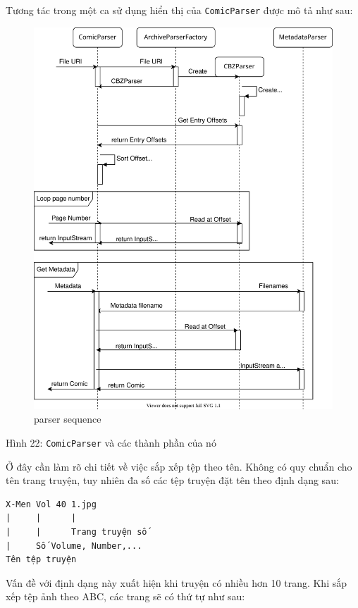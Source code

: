 \documentclass[
]{article}
\begin{document}
Tương tác trong một ca sử dụng hiển thị của \texttt{ComicParser} được mô
tả như sau:

\begin{figure}
\centering
\includegraphics{../images/parser_sequence.svg}
\caption{parser sequence}
\end{figure}

Hình 22: \texttt{ComicParser} và các thành phần của nó

Ở đây cần làm rõ chi tiết về việc sắp xếp tệp theo tên. Không có quy
chuẩn cho tên trang truyện, tuy nhiên đa số các tệp truyện đặt tên theo
định dạng sau:

\begin{verbatim}
X-Men Vol 40 1.jpg
|     |      |
|     |      Trang truyện số
|     Số Volume, Number,...
Tên tệp truyện
\end{verbatim}

Vấn đề với định dạng này xuất hiện khi truyện có nhiều hơn 10 trang. Khi
sắp xếp tệp ảnh theo ABC, các trang sẽ có thứ tự như sau:
\end{document}
